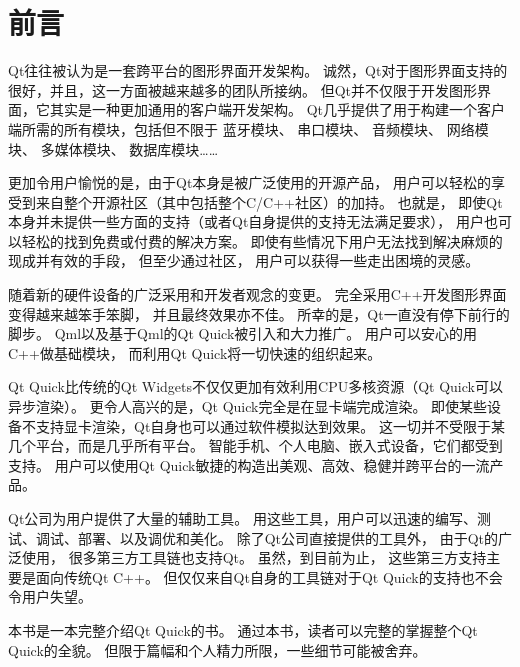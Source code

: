 ﻿%






\cleardoublepage                              %
\setcounter{secnumdepth}{-2}                  %
\chapter{
前言
}
\setcounter{secnumdepth}{3}                   %


Qt往往被认为是一套跨平台的图形界面开发架构。
诚然，Qt对于图形界面支持的很好，并且，这一方面被越来越多的团队所接纳。
但Qt并不仅限于开发图形界面，它其实是一种更加通用的客户端开发架构。
Qt几乎提供了用于构建一个客户端所需的所有模块，包括但不限于
蓝牙模块、
串口模块、
音频模块、
网络模块、
多媒体模块、
数据库模块……

更加令用户愉悦的是，由于Qt本身是被广泛使用的开源产品，
用户可以轻松的享受到来自整个开源社区（其中包括整个C/C++社区）的加持。
也就是，
即使Qt本身并未提供一些方面的支持（或者Qt自身提供的支持无法满足要求），
用户也可以轻松的找到免费或付费的解决方案。
即使有些情况下用户无法找到解决麻烦的现成并有效的手段，
但至少通过社区，
用户可以获得一些走出困境的灵感。

随着新的硬件设备的广泛采用和开发者观念的变更。
完全采用C++开发图形界面变得越来越笨手笨脚，
并且最终效果亦不佳。
所幸的是，Qt一直没有停下前行的脚步。
Qml以及基于Qml的Qt Quick被引入和大力推广。
用户可以安心的用C++做基础模块，
而利用Qt Quick将一切快速的组织起来。

Qt Quick比传统的Qt Widgets不仅仅更加有效利用CPU多核资源（Qt Quick可以异步渲染）。
更令人高兴的是，Qt Quick完全是在显卡端完成渲染。
即使某些设备不支持显卡渲染，Qt自身也可以通过软件模拟达到效果。
这一切并不受限于某几个平台，而是几乎所有平台。
智能手机、个人电脑、嵌入式设备，它们都受到支持。
用户可以使用Qt Quick敏捷的构造出美观、高效、稳健并跨平台的一流产品。

Qt公司为用户提供了大量的辅助工具。
用这些工具，用户可以迅速的编写、测试、调试、部署、以及调优和美化。
除了Qt公司直接提供的工具外，
由于Qt的广泛使用，
很多第三方工具链也支持Qt。
虽然，到目前为止，
这些第三方支持主要是面向传统Qt C++。
但仅仅来自Qt自身的工具链对于Qt Quick的支持也不会令用户失望。


本书是一本完整介绍Qt Quick的书。
通过本书，读者可以完整的掌握整个Qt Quick的全貌。
但限于篇幅和个人精力所限，一些细节可能被舍弃。

